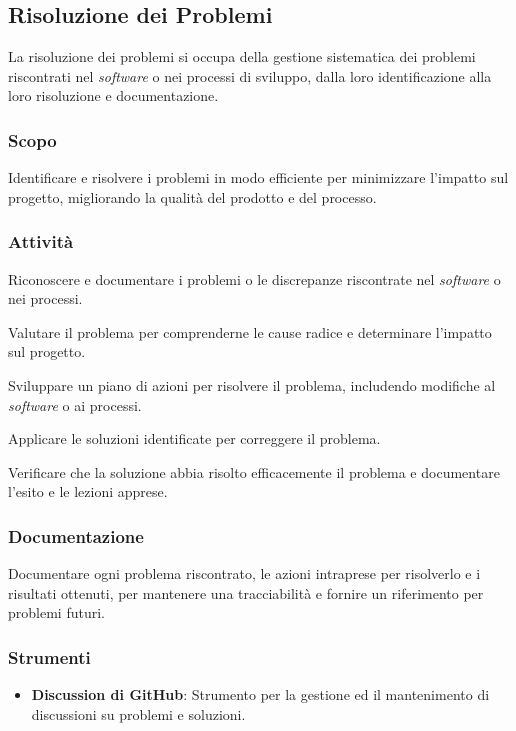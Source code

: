 \subsection{Risoluzione dei Problemi}

La risoluzione dei problemi si occupa della gestione sistematica dei problemi
riscontrati nel \textit{software} o nei processi di sviluppo, dalla loro
identificazione alla loro risoluzione e documentazione.

\subsubsection{Scopo}
Identificare e risolvere i problemi in modo efficiente per minimizzare l'impatto
sul progetto, migliorando la qualità del prodotto e del processo.

\subsubsection{Attività}
Riconoscere e documentare i
	  problemi o le discrepanze riscontrate nel \textit{software} o nei
	  processi.

Valutare il problema per comprenderne
	  le cause radice e determinare l'impatto sul progetto.

Sviluppare un piano
	  di azioni per risolvere il problema, includendo modifiche al
	  \textit{software} o ai processi.

Applicare le
	  soluzioni identificate per correggere il problema.

Verificare che la soluzione abbia
	  risolto efficacemente il problema e documentare l'esito e le lezioni
	  apprese.

\subsubsection{Documentazione}
Documentare ogni problema riscontrato, le azioni intraprese per risolverlo e i
risultati ottenuti, per mantenere una tracciabilità e fornire un riferimento
per problemi futuri.

\subsubsection{Strumenti}
\begin{itemize}
	\item \textbf{Discussion di GitHub\g}: Strumento per la gestione ed
	      il mantenimento di discussioni su problemi e soluzioni.
\end{itemize}
